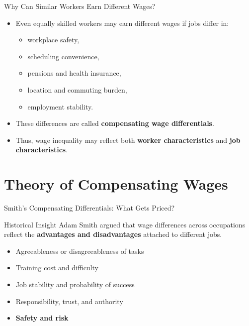\documentclass[aspectratio=169]{beamer}
\begin{document}
\begin{frame}{Why Can Similar Workers Earn Different Wages?}
\transfade
\begin{itemize}[<+->]
  \item Even equally skilled workers may earn different wages if jobs differ in:
  \begin{itemize}[<+->]
    \item workplace safety,
    \item scheduling convenience,
    \item pensions and health insurance,
    \item location and commuting burden,
    \item employment stability.
  \end{itemize}
  \item These differences are called \textbf{compensating wage differentials}.
  \item Thus, wage inequality may reflect both \textbf{worker characteristics} and \textbf{job characteristics}.
\end{itemize}
\end{frame}

\section{Theory of Compensating Wages}

\begin{frame}{Smith's Compensating Differentials: What Gets Priced?}
\transfade
\begin{block}{Historical Insight}
Adam Smith argued that wage differences across occupations reflect the \textbf{advantages and disadvantages} attached to different jobs.
\end{block}
\begin{itemize}[<+->]
  \item Agreeableness or disagreeableness of tasks
  \item Training cost and difficulty
  \item Job stability and probability of success
  \item Responsibility, trust, and authority
  \item \textbf{Safety and risk}
\end{itemize}
\end{frame}
\end{document}
